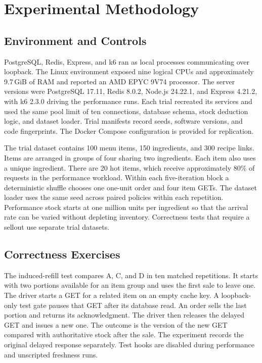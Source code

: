\section{Experimental Methodology}

\subsection{Environment and Controls}

PostgreSQL, Redis, Express, and k6 ran as local processes communicating over loopback. The Linux environment exposed nine logical CPUs and approximately 9.7\,GiB of RAM and reported an AMD EPYC 9V74 processor. The server versions were PostgreSQL 17.11, Redis 8.0.2, Node.js 24.22.1, and Express 4.21.2, with k6 2.3.0 driving the performance runs. Each trial recreated its services and used the same pool limit of ten connections, database schema, stock deduction logic, and dataset loader. Trial manifests record seeds, software versions, and code fingerprints. The Docker Compose configuration is provided for replication.

The trial dataset contains 100 menu items, 150 ingredients, and 300 recipe links. Items are arranged in groups of four sharing two ingredients. Each item also uses a unique ingredient. There are 20 hot items, which receive approximately 80\% of requests in the performance workload. Within each five-iteration block a deterministic shuffle chooses one one-unit order and four item GETs. The dataset loader uses the same seed across paired policies within each repetition. Performance stock starts at one million units per ingredient so that the arrival rate can be varied without depleting inventory. Correctness tests that require a sellout use separate trial datasets.

\subsection{Correctness Exercises}

The induced-refill test compares A, C, and D in ten matched repetitions. It starts with two portions available for an item group and uses the first sale to leave one. The driver starts a GET for a related item on an empty cache key. A loopback-only test gate pauses that GET after its database read. An order sells the last portion and returns its acknowledgment. The driver then releases the delayed GET and issues a new one. The outcome is the version of the new GET compared with authoritative stock after the sale. The experiment records the original delayed response separately. Test hooks are disabled during performance and unscripted freshness runs.

